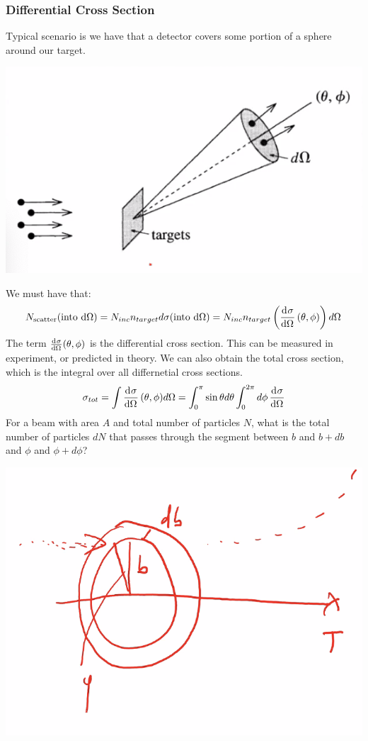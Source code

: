 \documentclass[../PHYS306Notes.tex]{subfiles}
\begin{document}
\subsubsection{Differential Cross Section}
Typical scenario is we have that a detector covers some portion of a sphere around our target.
\begin{center}
    \includegraphics[scale=0.8]{Lecture-27/l27-img8.png}
\end{center}
We must have that:
\[N_{\text{scatter}}(\text{into d$\Omega$}) = N_{inc}n_{target}d\sigma(\text{into d$\Omega$}) = N_{inc}n_{target}\left(\dod{\sigma}{\Omega}(\theta, \phi)\right)d\Omega\]
The term $\od{\sigma}{\Omega}(\theta, \phi)$ is the differential cross section. This can be measured in experiment, or predicted in theory. We can also obtain the total cross section, which is the integral over all differnetial cross sections.
\[\sigma_{tot} = \int \dod{\sigma}{\Omega}(\theta, \phi) d\Omega = \int_0^\pi \sin\theta d\theta \int
_0^{2\pi}d\phi\dod{\sigma}{\Omega}\]
For a beam with area $A$ and total number of particles $N$, what is the total number of particles $dN$ that passes through the segment between $b$ and $b + db$ and $\phi$ and $\phi + d\phi$?
\begin{center}
    \includegraphics[scale=0.7]{Lecture-27/l27-img9.png}
\end{center}
\end{document}
